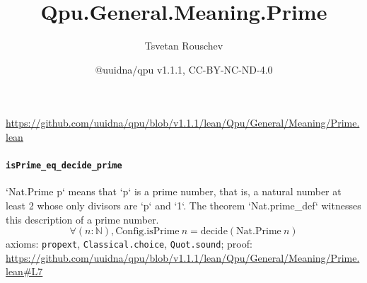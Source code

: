 \documentclass[11pt]{article}
\title{Qpu.General.Meaning.Prime}
\author{Tsvetan Rouschev}
\date{@uuidna/qpu v1.1.1, CC-BY-NC-ND-4.0}
\begin{document}
\maketitle
\noindent\url{https://github.com/uuidna/qpu/blob/v1.1.1/lean/Qpu/General/Meaning/Prime.lean}

\paragraph{\texttt{isPrime\_eq\_decide\_prime}}
`Nat.Prime p` means that `p` is a prime number, that is, a natural number at least 2 whose only divisors are `p` and `1`. The theorem `Nat.prime\_def` witnesses this description of a prime number.
\[ \forall (n : \mathbb{N}), \mathrm{Config.isPrime}\ n = \mathrm{decide} (\mathrm{Nat.Prime}\ n) \]
\noindent axioms: \texttt{propext}, \texttt{Classical.choice}, \texttt{Quot.sound}; proof: \url{https://github.com/uuidna/qpu/blob/v1.1.1/lean/Qpu/General/Meaning/Prime.lean\#L7}
\end{document}
